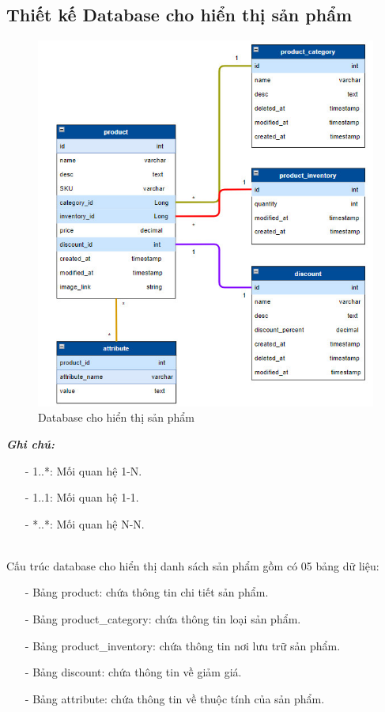 \subsection{Thiết kế Database cho hiển thị sản phẩm}
 \begin{figure}[H]
    \begin{center}
    \includegraphics[scale = 0.8]{images/phat/DB_catalog.jpg}
    \vspace*{7mm}
    \caption{Database cho hiển thị sản phẩm}
    \end{center}
    \label{}
\end{figure}
\textbf{\textit{Ghi chú:}}
\begin{itemize}
    \item [-] 1..*: Mối quan hệ 1-N.
    \item [-] 1..1: Mối quan hệ 1-1.
    \item [-] *..*: Mối quan hệ N-N.
\end{itemize}
\\
\noindent Cấu trúc database cho hiển thị danh sách sản phẩm gồm có 05 bảng dữ liệu:
\begin{itemize}
    \item [-] Bảng product: chứa thông tin chi tiết sản phẩm.
    \item [-] Bảng product\_category: chứa thông tin loại sản phẩm.
    \item [-] Bảng product\_inventory: chứa thông tin nơi lưu trữ sản phẩm.
    \item [-] Bảng discount: chứa thông tin về giảm giá.
    \item [-] Bảng attribute: chứa thông tin về thuộc tính của sản phẩm.
\end{itemize}
